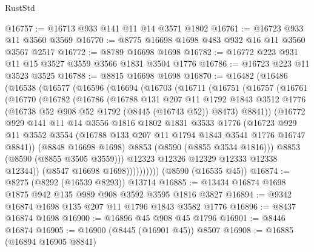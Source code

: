 \begin{lexlean}{RustStd}
\begin{coremodule}
@16757 := @16713 @933 @141 @11 @14 @3571 @1802
@16761 := @16723 @933 @11 @3560 @3569
@16770 := @8775 @16698 @1698 @483 @932 @16 @11 @3560 @3567 @2517
@16772 := @8789 @16698 @1698
@16782 := @16772 @223 @931 @11 @15 @3527 @3559 @3566 @1831 @3504 @1776
@16786 := @16723 @223 @11 @3523 @3525
@16788 := @8815 @16698 @1698
@16870 := @16482
    (@16486
      (@16538
        (@16577
          (@16596
            (@16694
              (@16703
                (@16711
                  (@16751
                    (@16757
                      (@16761
                        (@16770
                          (@16782
                            (@16786
                              (@16788
                                @131
                                @207
                                @11
                                @1792
                                @1843
                                @3512
                                @1776
                                (@16738 @52 @908 @52 @1792 (@8445 (@16743 @52)) @8473)
                                @8841))
                            (@16772
                              @929
                              @141
                              @11
                              @14
                              @3556
                              @1816
                              @1802
                              @1831
                              @3533
                              @1776
                              (@16723
                                @929
                                @11
                                @3552
                                @3554
                                (@16788 @133 @207 @11 @1794 @1843 @3541 @1776 @16747 @8841))
                              (@8848 @16698 @1698)
                              @8853
                              (@8590 (@8855 @3534 @1816)))
                            @8853
                            (@8590 (@8855 @3505 @3559)))
                          @12323
                          @12326
                          @12329
                          @12333
                          @12338
                          @12344))
                      (@8547 @16698 @1698))))))))))
    (@8590 (@16535 @45))
@16874 := @8275 (@8292 (@16539 @8293)) @13714
@16885 := @13434 @16874 @1698 @1875 @942 @135 @989 @908 @3592 @3595 @1816 @3827
@16894 := @9342 @16874 @1698 @135 @207 @11 @1796 @1843 @3582 @1776
@16896 := @8437 @16874 @1698
@16900 := @16896 @45 @908 @45 @1796
@16901 := @8446 @16874
@16905 := @16900 (@8445 (@16901 @45)) @8507
@16908 := @16885 (@16894 @16905 @8841)

\end{coremodule}
\end{lexlean}
